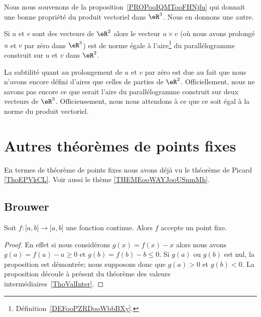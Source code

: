 Nous nous souvenons de la proposition~\ref{PROPooIQMTooFHNjfu} qui donnait une bonne propriété du produit vectoriel dans \( \eR^3\). Nous en donnons une autre.

\begin{proposition}
    Si \( u\) et \( v\) sont des vecteurs de \( \eR^2\) alors le vecteur \( u\times v\) (où nous avons prolongé \( u\) et \( v\) par zéro dans \( \eR^3\)) est de norme égale à l'aire\footnote{Définition~\ref{DEFooPZRDooWbbBXy}.} du parallélogramme construit sur \( u\) et \( v\) dans \( \eR^2\).
\end{proposition}

La subtilité quant au prolongement de \( u\) et \( v\) par zéro est due au fait que nous n'avons encore défini d'aires que celles de parties de \( \eR^2\). Officiellement, nous ne savons pas encore ce que serait l'aire du parallélogramme construit sur deux vecteurs de \( \eR^3\). Officieusement, nous nous attendons à ce que ce soit égal à la norme du produit vectoriel.

\section{Autres théorèmes de points fixes}
\label{SECooDWMPooWZgzRZ}

En termes de théorème de points fixes nous avons déjà vu le théorème de Picard \ref{ThoEPVkCL}. Voir aussi le thème \ref{THEMEooWAYJooUSnmMh}.

\subsection{Brouwer}
\label{subSecZCCmMnQ}

\begin{proposition}
    Soit \( f\colon \mathopen[ a , b \mathclose]\to \mathopen[ a , b \mathclose]\) une fonction continue. Alors \( f\) accepte un point fixe.
\end{proposition}

\begin{proof}
    En effet si nous considérons \( g(x)=f(x)-x\) alors nous avons \( g(a)=f(a)-a\geq 0\) et \( g(b)=f(b)-b\leq 0\). Si \( g(a)\) ou \( g(b)\) est nul, la proposition est démontrée; nous supposons donc que \( g(a)>0\) et \( g(b)<0\). La proposition découle à présent du théorème des valeurs intermédiaires~\ref{ThoValInter}.
\end{proof}

